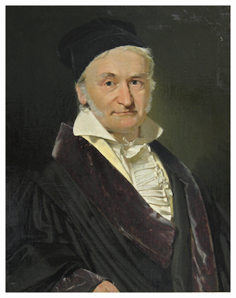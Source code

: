 \documentclass[]{article}
\begin{document}
\begin{figure}
  \label{fig:gabor-input-output}
  \centering
    \begin{subfigure}[t]{0.49\textwidth}
      \centering
      \includegraphics[width=1.\linewidth]{input2.png}
    \end{subfigure}
    \begin{subfigure}[t]{0.49\textwidth}
      \centering

\end{subfigure}
\end{figure}
\end{document}
